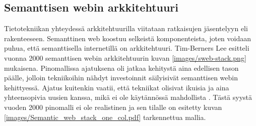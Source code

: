 \documentclass[finnish, 12pt, a4paper, elec, utf8, pdfa, online]{aaltothesis}
\begin{document}
{\subsection{Semanttisen webin arkkitehtuuri}
Tietotekniikan yhteydessä arkkitehtuurilla viitataan ratkaisujen jäsentelyyn eli rakenteeseen. Semanttinen web koostuu selkeistä komponenteista, joten voidaan puhua, että semanttisella internetillä on arkkitehtuuri. Tim-Berners Lee esitteli vuonna 2000 semanttisen webin arkkitehtuurin kuvan \ref{images/sweb-stack.png} mukaisena. Pinomallissa ajatuksena oli jatkaa kehitystä aina edellisen tason päälle, jolloin tekniikoihin nähdyt investoinnit säilyisivät semanttisen webin kehittyessä. Ajatus kuitenkin vaatii, että tekniikat olisivat ikuisia ja aina yhteensopivia uusien kanssa, mikä ei ole käytännössä mahdollista \cite{stack}. Tästä syystä vuoden 2000 pinomalli ei ole realistinen ja sen tilalle on esitetty kuvan \ref{images/Semantic_web_stack_one_col.pdf} tarkennettua mallia.

}
\end{document}
